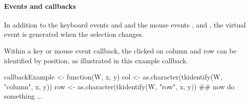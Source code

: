 
\paragraph{Events and callbacks}
In addition to the keyboard events  and
 and the mouse events ,
 and , the virtual event
 is generated when the selection changes.

Within a key or mouse event callback, the clicked on column and row can
be identified by position, as illustrated in this example callback.
\begin{Schunk}
\begin{Sinput}
 callbackExample <- function(W, x, y) {
   col <- as.character(tkidentify(W, "column", x, y))
   row <- as.character(tkidentify(W, "row", x, y))
   ## now do something ...
 }
\end{Sinput}
\end{Schunk}


